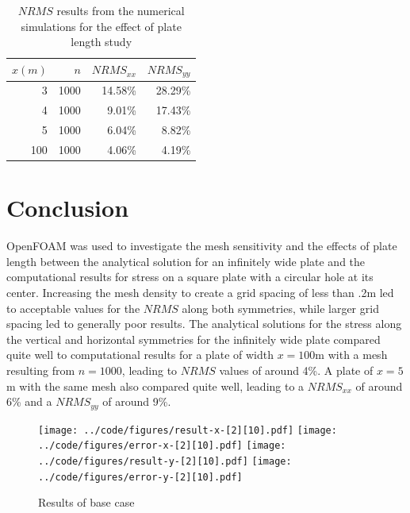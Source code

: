 \documentclass[twocolumn,10pt]{asme2ej}
\begin{document}
\begin{table}[htb]
\begin{center}
\begin{tabular}{|r r | r r|}
\hline
$x (m)$ & $n$ & $NRMS_{xx}$ & $NRMS_{yy}$ \\
\hline
3   & 1000 & 14.58\% & 28.29\% \\
4   & 1000 & 9.01\% & 17.43\% \\
5   & 1000 & 6.04\% & 8.82\% \\
100 & 1000 & 4.06\% & 4.19\% \\
\hline
\end{tabular}
\caption{$NRMS$ results from the numerical simulations for the effect of plate length study}
\label{length_table}
\end{center}
\end{table}

\section{Conclusion}
OpenFOAM was used to investigate the mesh sensitivity and the effects of plate length between the analytical solution for an infinitely wide plate and the computational results for stress on a square plate with a circular hole at its center. Increasing the mesh density to create a grid spacing of less than .2m led to acceptable values for the $NRMS$ along both symmetries, while larger grid spacing led to generally poor results. The analytical solutions for the stress along the vertical and horizontal symmetries for the infinitely wide plate compared quite well to computational results for a plate of width $x = 100$m with a mesh resulting from $n = 1000$, leading to $NRMS$ values of around 4\%. A plate of $x = 5$m with the same mesh also compared quite well, leading to a $NRMS_{xx}$ of around 6\% and a $NRMS_{yy}$ of around 9\%.




\begin{figure}[thb]
\begin{center}
\texttt{[image: ../code/figures/result-x-[2][10].pdf]}
\texttt{[image: ../code/figures/error-x-[2][10].pdf]}
\texttt{[image: ../code/figures/result-y-[2][10].pdf]}
\texttt{[image: ../code/figures/error-y-[2][10].pdf]}
\caption{Results of base case}
\label{base_study}
\end{center}
\end{figure}
\end{document}
